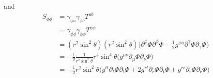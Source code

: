 \documentclass[12pt]{article}
\numberwithin{equation}{section}
\begin{document}
and
\begin{equation}
\begin{aligned}
S_{\phi \phi} &= \gamma_{\phi a} \gamma_{\phi b} T^{ab} \\
&= \gamma_{\phi \phi} \gamma_{\phi \phi} T^{\phi \phi} \\
&= (r^2 \sin^2 \theta) (r^2 \sin^2 \theta) \Big( \partial^\phi \Phi \partial^\phi \Phi - \frac{1}{2} g^{\phi \phi} \partial^\gamma \Phi \partial_\gamma \Phi  \Big) \\
&= - \frac{1}{2} \frac{1}{r^2 \sin^2 \theta} r^4 \sin^4 \theta \Big( g^{\mu \nu} \partial_\mu \Phi \partial_\nu \Phi  \Big) \\
&= - \frac{1}{2} r^2 \sin^2 \theta \Big( g^{t t} \partial_t \Phi \partial_t \Phi + 2 g^{r t} \partial_r \Phi \partial_t \Phi + g^{r r} \partial_r \Phi \partial_r \Phi \Big) \\
\end{aligned}
\end{equation}

\end{document}
